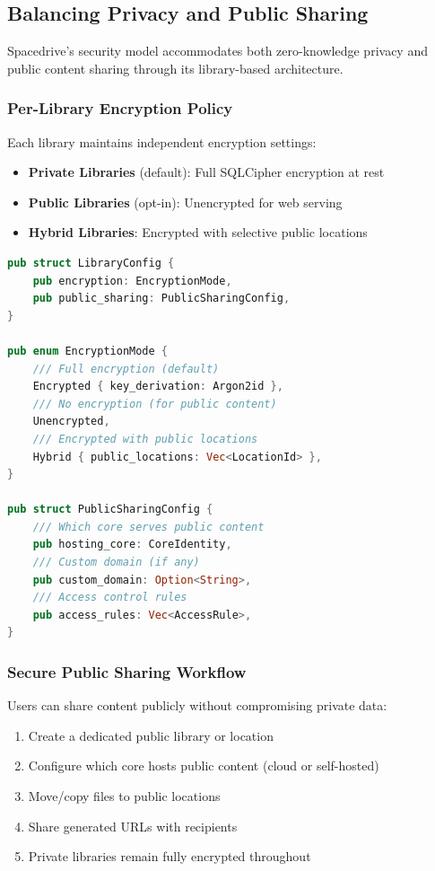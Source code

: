 \documentclass[sigconf]{acmart}
\begin{document}
\subsection{Balancing Privacy and Public Sharing}

Spacedrive's security model accommodates both zero-knowledge privacy and public content sharing through its library-based architecture.

\subsubsection{Per-Library Encryption Policy}

Each library maintains independent encryption settings:

\begin{itemize}
    \item \textbf{Private Libraries} (default): Full SQLCipher encryption at rest
    \item \textbf{Public Libraries} (opt-in): Unencrypted for web serving
    \item \textbf{Hybrid Libraries}: Encrypted with selective public locations
\end{itemize}

\begin{lstlisting}[language=Rust, caption=Library encryption configuration]
pub struct LibraryConfig {
    pub encryption: EncryptionMode,
    pub public_sharing: PublicSharingConfig,
}

pub enum EncryptionMode {
    /// Full encryption (default)
    Encrypted { key_derivation: Argon2id },
    /// No encryption (for public content)
    Unencrypted,
    /// Encrypted with public locations
    Hybrid { public_locations: Vec<LocationId> },
}

pub struct PublicSharingConfig {
    /// Which core serves public content
    pub hosting_core: CoreIdentity,
    /// Custom domain (if any)
    pub custom_domain: Option<String>,
    /// Access control rules
    pub access_rules: Vec<AccessRule>,
}
\end{lstlisting}

\subsubsection{Secure Public Sharing Workflow}

Users can share content publicly without compromising private data:

\begin{enumerate}
    \item Create a dedicated public library or location
    \item Configure which core hosts public content (cloud or self-hosted)
    \item Move/copy files to public locations
    \item Share generated URLs with recipients
    \item Private libraries remain fully encrypted throughout
\end{enumerate}
\end{document}
